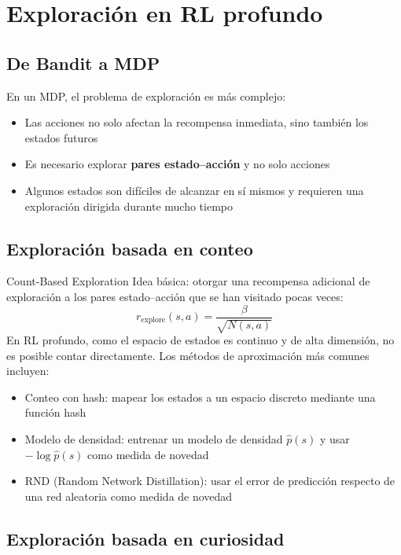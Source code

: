 \section{Exploración en RL profundo}

\subsection{De Bandit a MDP}

En un MDP, el problema de exploración es más complejo:
\begin{itemize}
    \item Las acciones no solo afectan la recompensa inmediata, sino también los estados futuros
    \item Es necesario explorar \textbf{pares estado--acción} y no solo acciones
    \item Algunos estados son difíciles de alcanzar en sí mismos y requieren una exploración dirigida durante mucho tiempo
\end{itemize}

\subsection{Exploración basada en conteo}

\begin{importantbox}{Count-Based Exploration}
Idea básica: otorgar una recompensa adicional de exploración a los pares estado--acción que se han visitado pocas veces:
$$r_{\text{explore}}(s, a) = \frac{\beta}{\sqrt{N(s, a)}}$$
En RL profundo, como el espacio de estados es continuo y de alta dimensión, no es posible contar directamente. Los métodos de aproximación más comunes incluyen:
\begin{itemize}
    \item Conteo con hash: mapear los estados a un espacio discreto mediante una función hash
    \item Modelo de densidad: entrenar un modelo de densidad $\hat{p}(s)$ y usar $-\log \hat{p}(s)$ como medida de novedad
    \item RND (Random Network Distillation): usar el error de predicción respecto de una red aleatoria como medida de novedad
\end{itemize}
\end{importantbox}

\subsection{Exploración basada en curiosidad}

